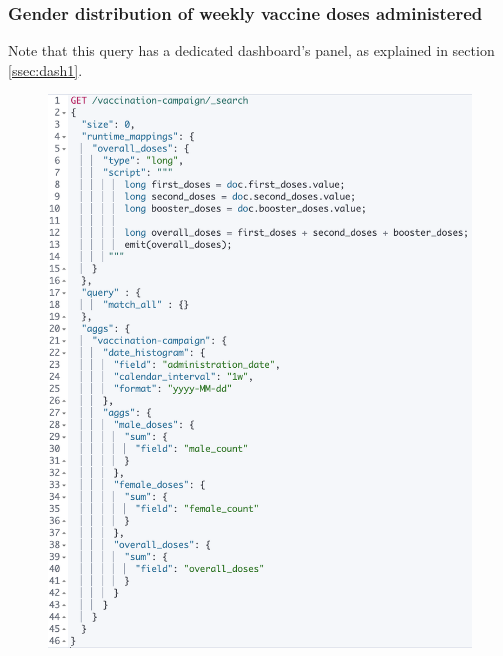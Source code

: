 \documentclass{article}[IEEEtran]
\begin{document}
\newpage

\subsubsection{Gender distribution of weekly vaccine doses administered}\label{ssec:q3}


Note that this query has a dedicated dashboard's panel, as explained in section \ref{ssec:dash1}.

\begin{figure}[H]
\begin{center}
\begin{minipage}[b]{0.4\textwidth}
    \includegraphics[width=\textwidth, frame]{Query_4BIS.PNG}
    \subcaption{}
  \end{minipage}
  \hfill
  \begin{minipage}[b]{0.4\textwidth}

\end{minipage}
\end{center}
\end{figure}
\end{document}

